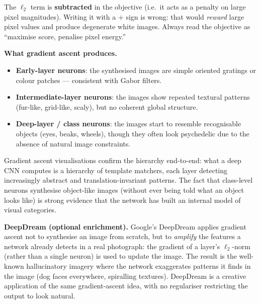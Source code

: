 \documentclass[11pt,a4paper]{article}
\begin{document}
\begin{warnbox}
The $\ell_2$ term is \textbf{subtracted} in the objective (i.e.\ it acts as a penalty on large pixel magnitudes).  Writing it with a $+$ sign is wrong: that would \emph{reward} large pixel values and produce degenerate white images.  Always read the objective as ``maximise score, penalise pixel energy.''
\end{warnbox}

\textbf{What gradient ascent produces.}
\begin{itemize}
  \item \textbf{Early-layer neurons}: the synthesised images are simple oriented gratings or colour patches — consistent with Gabor filters.
  \item \textbf{Intermediate-layer neurons}: the images show repeated textural patterns (fur-like, grid-like, scaly), but no coherent global structure.
  \item \textbf{Deep-layer / class neurons}: the images start to resemble recognisable objects (eyes, beaks, wheels), though they often look psychedelic due to the absence of natural image constraints.
\end{itemize}

\begin{insightbox}
Gradient ascent visualisations confirm the hierarchy end-to-end: what a deep CNN computes is a hierarchy of template matchers, each layer detecting increasingly abstract and translation-invariant patterns.  The fact that class-level neurons synthesise object-like images (without ever being told what an object looks like) is strong evidence that the network has built an internal model of visual categories.
\end{insightbox}

\textbf{DeepDream (optional enrichment).} Google's DeepDream applies gradient ascent not to synthesise an image from scratch, but to \emph{amplify} the features a network already detects in a real photograph: the gradient of a layer's $\ell_2$-norm (rather than a single neuron) is used to update the image.  The result is the well-known hallucinatory imagery where the network exaggerates patterns it finds in the image (dog faces everywhere, spiralling textures).  DeepDream is a creative application of the same gradient-ascent idea, with no regulariser restricting the output to look natural.

\end{document}
